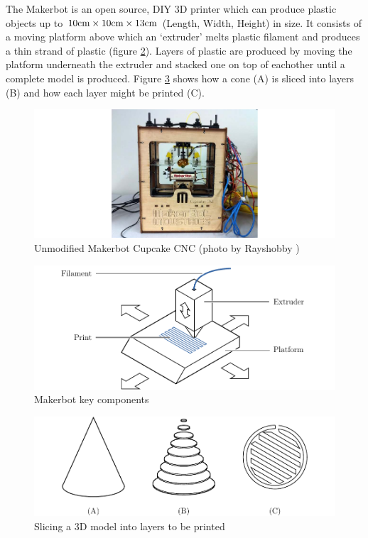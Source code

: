 		The Makerbot is an open source, DIY 3D printer which can produce plastic
		objects up to $10\textrm{cm}\times10\textrm{cm}\times13\textrm{cm}$ (Length, Width, Height) in size.
		It consists of a moving platform above which an `extruder' melts plastic
		filament and produces a thin strand of plastic (figure
		\ref{fig:printerBasics}). Layers of plastic are produced by moving the
		platform underneath the extruder and stacked one on top of eachother until a
		complete model is produced. Figure \ref{fig:slicing} shows how a cone (A)
		is sliced into layers (B) and how each layer might be printed (C).
	
		\begin{figure}
			\includegraphics[width=1\textwidth]{diagrams/makerbotOrig.pdf}
			\caption{Unmodified Makerbot Cupcake CNC (photo by Rayshobby
			         \cite{rayshobby})}
			\label{fig:makerbotOrig}
		\end{figure}
	
		\begin{figure}
			\includegraphics[width=1\textwidth]{diagrams/printerBasics.pdf}
			\caption{Makerbot key components}
			\label{fig:printerBasics}
		\end{figure}
		
		\begin{figure}
			\includegraphics[width=1\textwidth]{diagrams/slicing.pdf}
			\caption{Slicing a 3D model into layers to be printed}
			\label{fig:slicing}
		\end{figure}
		
